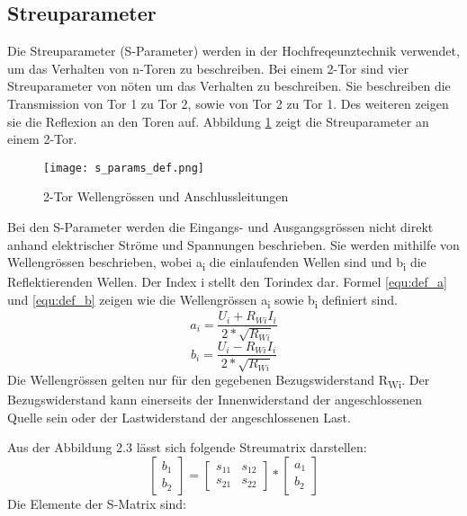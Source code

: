 \subsection{Streuparameter}\label{subsec:Streuparameter}
Die Streuparameter (S-Parameter) werden in der Hochfreqeunztechnik verwendet, um das Verhalten von n-Toren zu beschreiben. Bei einem 2-Tor sind vier Streuparameter von nöten um das Verhalten zu beschreiben. Sie beschreiben die Transmission von Tor 1 zu Tor 2, sowie von Tor 2 zu Tor 1. Des weiteren zeigen sie die Reflexion an den Toren auf. Abbildung \ref{fig:2-Tor}  zeigt die Streuparameter an einem 2-Tor. 
\begin{figure}[H]
	\centering
	\texttt{[image: s\_params\_def.png]}
	\caption{2-Tor Wellengrössen und Anschlussleitungen}
	\label{fig:2-Tor}
\end{figure}
Bei den S-Parameter werden die Eingangs- und Ausgangsgrössen nicht direkt anhand elektrischer Ströme und Spannungen beschrieben. Sie werden mithilfe von Wellengrössen beschrieben, wobei a\textsubscript{i} die einlaufenden Wellen sind und b\textsubscript{i} die Reflektierenden Wellen. Der Index i stellt den Torindex dar. Formel \ref{equ:def_a} und \ref{equ:def_b} zeigen wie die Wellengrössen a\textsubscript{i} sowie b\textsubscript{i} definiert sind.
\begin{equation}\label{equ:def_a}
	a_{ i } = \frac{ U_{ i}+R_{ Wi }I_{ i }}{2*\sqrt{ R_{ Wi } }}
\end{equation}
\begin{equation}\label{equ:def_b}
	b_{ i } = \frac{ U_{ i}-R_{ Wi }I_{ i }}{2*\sqrt{ R_{ Wi } }}
\end{equation}
Die Wellengrössen gelten nur für den gegebenen Bezugswiderstand R\textsubscript{Wi}. Der Bezugswiderstand kann einerseits der Innenwiderstand der angeschlossenen Quelle sein oder der Lastwiderstand der angeschlossenen Last.

Aus der Abbildung 2.3 lässt sich folgende Streumatrix darstellen:
\begin{equation}
	\left[
		\begin{matrix}b_1 \\ b_2 \end{matrix}
	\right]
 	=
 	\left[
 		\begin{matrix}
			s_{11}&s_{12} \\s_{21}&s_{22}
		\end{matrix}
	\right]
	* 
	\left[
		\begin{matrix}
			a_1\\b_2
		\end{matrix}
	\right]
\end{equation}
Die Elemente der S-Matrix sind:

